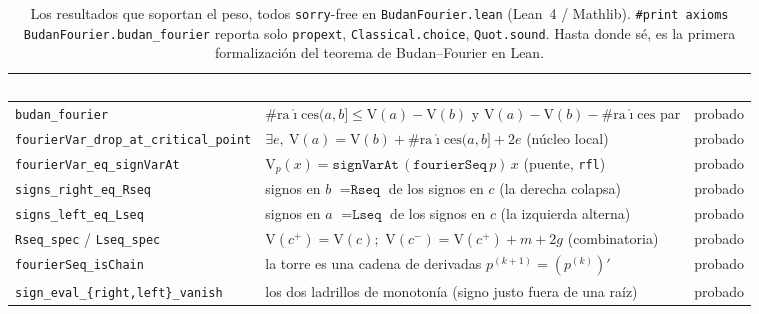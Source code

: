 \documentclass[11pt]{article}
\newcommand{\lean}[1]{\texttt{#1}}
\newcommand{\V}{\mathrm{V}}
\begin{document}
\begin{table}[H]
  \centering\footnotesize
  \begin{tabular}{@{}llc@{}}
    \toprule
    \rowcolor{ggteal}
    \textcolor{white}{\textbf{Nombre Lean}} & \textcolor{white}{\textbf{Enunciado}} & \textcolor{white}{\textbf{Estado}} \\
    \midrule
    \rowcolor{ggband}
    \lean{budan\_fourier} & $\#\mathrm{ra\acute{\imath}ces}(a,b]\le \V(a){-}\V(b)$ y $\V(a){-}\V(b){-}\#\mathrm{ra\acute{\imath}ces}$ par & probado \\
    \lean{fourierVar\_drop\_at\_critical\_point} & $\exists e,\ \V(a)=\V(b)+\#\mathrm{ra\acute{\imath}ces}(a,b]+2e$ (n\'ucleo local) & probado \\
    \rowcolor{ggband}
    \lean{fourierVar\_eq\_signVarAt} & $\V_p(x)=\lean{signVarAt}\,(\lean{fourierSeq}\,p)\,x$ (puente, \lean{rfl}) & probado \\
    \lean{signs\_right\_eq\_Rseq} & signos en $b$ $=\lean{Rseq}$ de los signos en $c$ (la derecha colapsa) & probado \\
    \rowcolor{ggband}
    \lean{signs\_left\_eq\_Lseq} & signos en $a$ $=\lean{Lseq}$ de los signos en $c$ (la izquierda alterna) & probado \\
    \lean{Rseq\_spec} / \lean{Lseq\_spec} & $\V(c^+){=}\V(c)$;\ $\V(c^-){=}\V(c^+){+}m{+}2g$ (combinatoria) & probado \\
    \rowcolor{ggband}
    \lean{fourierSeq\_isChain} & la torre es una cadena de derivadas $p^{(k+1)}=(p^{(k)})'$ & probado \\
    \lean{sign\_eval\_\{right,left\}\_vanish} & los dos ladrillos de monoton\'ia (signo justo fuera de una ra\'iz) & probado \\
    \bottomrule
  \end{tabular}
  \caption{Los resultados que soportan el peso, todos \lean{sorry}-free en \lean{BudanFourier.lean}
  (Lean~4 / Mathlib). \lean{\#print axioms BudanFourier.budan\_fourier} reporta solo \lean{propext},
  \lean{Classical.choice}, \lean{Quot.sound}. Hasta donde s\'e, es la primera formalizaci\'on del
  teorema de Budan--Fourier en Lean.}
  \label{tab:results}
\end{table}
\end{document}
